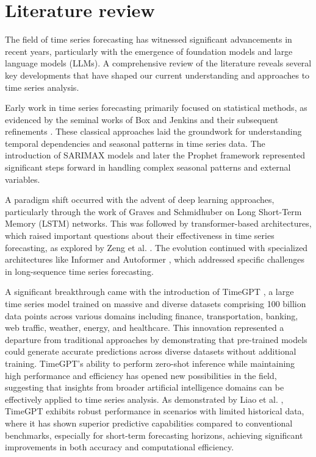 \documentclass[a4paper,twoside,flushend, 10pt]{article}
\begin{document}
\section{Literature review}
\noindent
The field of time series forecasting has witnessed significant advancements in recent years, particularly with the emergence of foundation models and large language models (LLMs). A comprehensive review of the literature reveals several key developments that have shaped our current understanding and approaches to time series analysis.

Early work in time series forecasting primarily focused on statistical methods, as evidenced by the seminal works of Box and Jenkins \cite{BJ1970} and their subsequent refinements \cite{BJ2015}. These classical approaches laid the groundwork for understanding temporal dependencies and seasonal patterns in time series data. The introduction of SARIMAX models \cite{HK2008} and later the Prophet framework \cite{TL2018} represented significant steps forward in handling complex seasonal patterns and external variables.

A paradigm shift occurred with the advent of deep learning approaches, particularly through the work of Graves and Schmidhuber \cite{GS2005} on Long Short-Term Memory (LSTM) networks. This was followed by transformer-based architectures, which raised important questions about their effectiveness in time series forecasting, as explored by Zeng et al. \cite{ZCLX23}. The evolution continued with specialized architectures like Informer \cite{ZZP2021} and Autoformer \cite{XTZ2021}, which addressed specific challenges in long-sequence time series forecasting.

A significant breakthrough came with the introduction of TimeGPT \cite{GM2023}, a large time series model trained on massive and diverse datasets comprising 100 billion data points across various domains including finance, transportation, banking, web traffic, weather, energy, and healthcare. This innovation represented a departure from traditional approaches by demonstrating that pre-trained models could generate accurate predictions across diverse datasets without additional training. TimeGPT's ability to perform zero-shot inference while maintaining high performance and efficiency has opened new possibilities in the field, suggesting that insights from broader artificial intelligence domains can be effectively applied to time series analysis. As demonstrated by Liao et al. \cite{LWY2025}, TimeGPT exhibits robust performance in scenarios with limited historical data, where it has shown superior predictive capabilities compared to conventional benchmarks, especially for short-term forecasting horizons, achieving significant improvements in both accuracy and computational efficiency.
\end{document}

